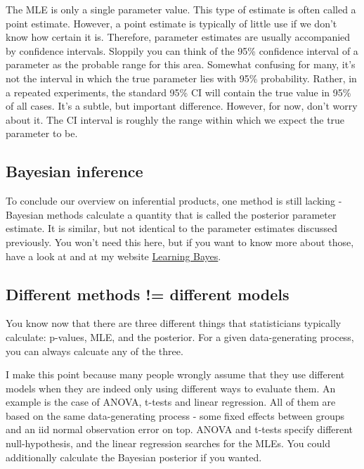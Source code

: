 \documentclass[a4paper,twoside]{tufte-book}\usepackage[]{graphicx}\usepackage[]{color}
\begin{document}
The MLE is only a single parameter value. This type of estimate is often called a point estimate. However, a point estimate is typically of little use if we don't know how certain it is. Therefore, parameter estimates are usually accompanied by confidence intervals. Sloppily you can think of the 95\% confidence interval of a parameter as the probable range for this area. Somewhat confusing for many, it's not the interval in which the true parameter lies with 95\% probability. Rather, in a repeated experiments, the standard 95\% CI will contain the true value in 95\% of all cases. It's a subtle, but important difference. However, for now, don't worry about it. The CI interval is roughly the range within which we expect the true parameter to be. 

\subsection{Bayesian inference}

To conclude our overview on inferential products, one method is still lacking - Bayesian methods calculate a quantity that is called the posterior parameter estimate. It is similar, but not identical to the parameter estimates discussed previously. You won't need this here, but if you want to know more about those, have a look at \citep{Gelman-BayesianDataAnalysis-2003} and at my website \href{http://florianhartig.github.io/LearningBayes/}{Learning Bayes}.

\subsection{Different methods != different models}

You know now that there are three different things that statisticians typically calculate: p-values, MLE, and the posterior. For a given data-generating process, you can always calcuate any of the three.

I make this point because many people wrongly assume that they use different models when they are indeed only using different ways to evaluate them. An example is the case of ANOVA, t-tests and linear regression. All of them are based on the same data-generating process - some fixed effects between groups and an iid normal observation error on top. ANOVA and t-tests specify different null-hypothesis, and the linear regression searches for the MLEs. You could additionally calculate the Bayesian posterior if you wanted.
\end{document}
